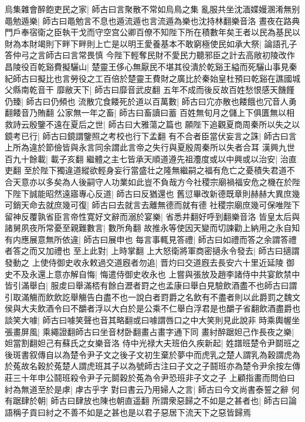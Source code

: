 烏集雜會醉飽吏民之家|{
	師古曰言聚散不常如烏鳥之集}
亂服共坐沈湎媟嫚溷淆無别黽勉遁樂|{
	師古曰黽勉言不息也遁流遁也言流遁為樂也沈持林翻樂音洛}
晝夜在路典門戶奉宿衛之臣執干戈而守空宫公卿百僚不知陛下所在積數年矣王者以民為基民以財為本財竭則下畔下畔則上亡是以明王愛養基本不敢窮極使民如承大祭|{
	論語孔子答仲弓之言師古曰言常畏慎}
今陛下輕奪民財不愛民力聽邪臣之計去高敞初陵改作昌陵役百乾谿費擬驪山|{
	楚靈王侈心無厭民不堪其役潰於乾谿王縊而死驪山事見秦紀師古曰擬比也言勞役之工百倍於楚靈王費財之廣比於秦始皇杜預曰乾谿在譙國城父縣南乾音干}
靡敝天下|{
	師古曰靡音武皮翻}
五年不成而後反故百姓愁恨感天饑饉仍臻|{
	師古曰仍頻也}
流散宂食餧死於道以百萬數|{
	師古曰宂亦散也餧餓也冗音人勇翻餧音乃賄翻}
公家無一年之畜|{
	師古曰畜讀曰蓄}
百姓無旬月之儲上下俱匱無以相救詩云殷鑒不遠在夏后之世|{
	師古曰大雅蕩之篇也}
願陛下追觀夏商周秦所以失之以鏡考已行|{
	師古曰鏡謂鑒照之考校也行下孟翻}
有不合者臣當伏妄言之誅|{
	師古曰言上所為違於節儉皆與永言同余謂此言帝之失行與夏殷周秦所以失者合耳}
漢興九世百九十餘載|{
	載子亥翻}
繼體之主七皆承天順道遵先祖灋度或以中興或以治安|{
	治直吏翻}
至於陛下獨違道縱欲輕身妄行當盛壮之隆無繼嗣之福有危亡之憂積失君道不合天意亦以多矣為人後嗣守人功業如此豈不負哉方今社稷宗廟禍福安危之機在於陛下陛下誠能昭然遠寤專心反道|{
	師古曰反猶還也}
舊愆畢改新德既章則赫赫大異庶幾可銷天命去就庶幾可復|{
	師古曰去就言去離無德而就有德}
社稷宗廟庶幾可保唯陛下留神反覆孰省臣言帝性寛好文辭而溺於宴樂|{
	省悉井翻好呼到翻樂音洛}
皆皇太后與諸舅夙夜所常憂至親難數言|{
	數所角翻}
故推永等使因天變而切諫勸上納用之永自知有内應展意無所依違|{
	師古曰展申也}
每言事輒見答禮|{
	師古曰如禮而答之余謂答禮者答之而又加禮也}
至上此對|{
	上時掌翻}
上大怒衛將軍商密擿永令發去|{
	師古曰擿謂發動之}
上使侍御史收永敕過交道廐者勿追|{
	晋灼曰交道廐去長安六十里近延陵}
御史不及永還上意亦解自悔|{
	悔遣侍御史收永也}
上嘗與張放及趙李諸侍中共宴飲禁中皆引滿舉白|{
	服䖍曰舉滿桮有餘白瀝者罸之也孟康曰舉白見驗飲酒盡不也師古曰謂引取滿觴而飲飲訖舉觴告白盡不也一說白者罸爵之名飲有不盡者則以此爵罰之魏文侯與大夫飲酒令曰不釂者浮以大白於是公乘不仁舉白浮君是也釂子省翻飲酒盡爵也}
談笑大噱|{
	師古曰噱笑聲也音其略翻或曰噱謂唇口之中大笑則見此說非}
時乘輿幄坐張畫屏風|{
	乘繩證翻師古曰坐音材卧翻畫占畫字通下同}
畫紂醉踞妲己作長夜之樂|{
	妲當割翻妲己有蘇氏之女樂音洛}
侍中光禄大夫班伯久疾新起|{
	姓譜班楚令尹鬬班之後斑書叙傳自以為楚令尹子文之後子文初生棄於夢中而虎乳之楚人謂乳為穀謂虎為於菟故名穀於菟楚人謂虎班其子以為號師古注曰子文之子鬪班亦為楚令尹余按左傳莊三十年申公鬪班殺令尹子元鬬穀於菟為令尹恐班非子文之子}
上顧指畫而問伯曰紂為無道至於是虖|{
	虖古乎字}
對曰書云乃用婦人之言|{
	師古曰今文尚書泰誓之辭}
何有踞肆於朝|{
	師古曰肆放也陳也朝直遥翻}
所謂衆惡歸之不如是之甚者也|{
	師古曰論語稱子貢曰紂之不善不如是之甚也是以君子惡居下流天下之惡皆歸焉}
